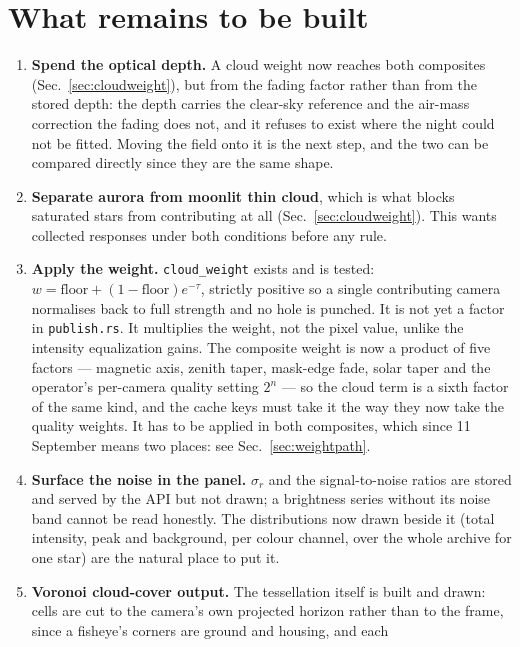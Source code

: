 \documentclass[11pt,a4paper]{article}
\begin{document}
\section{What remains to be built}
\label{sec:remains}

\begin{enumerate}
  \item \textbf{Spend the optical depth.} A cloud weight now reaches both
    composites (Sec.~\ref{sec:cloudweight}), but from the fading factor rather
    than from the stored depth: the depth carries the clear-sky reference and
    the air-mass correction the fading does not, and it refuses to exist where
    the night could not be fitted. Moving the field onto it is the next step,
    and the two can be compared directly since they are the same shape.
  \item \textbf{Separate aurora from moonlit thin cloud}, which is what blocks
    saturated stars from contributing at all (Sec.~\ref{sec:cloudweight}).
    This wants collected responses under both conditions before any rule.
  \item \textbf{Apply the weight.} \texttt{cloud\_weight} exists and is tested:
    $w=\text{floor}+(1-\text{floor})e^{-\tau}$, strictly positive so a single
    contributing camera normalises back to full strength and no hole is punched.
    It is not yet a factor in \texttt{publish.rs}. It multiplies the weight, not
    the pixel value, unlike the intensity equalization gains. The composite
    weight is now a product of five factors --- magnetic axis, zenith taper,
    mask-edge fade, solar taper and the operator's per-camera quality setting
    $2^{n}$ --- so the cloud term is a sixth factor of the same kind, and the
    cache keys must take it the way they now take the quality weights. It has to
    be applied in both composites, which since 11 September means two places:
    see Sec.~\ref{sec:weightpath}.
  \item \textbf{Surface the noise in the panel.} $\sigma_r$ and the
    signal-to-noise ratios are stored and served by the API but not drawn; a
    brightness series without its noise band cannot be read honestly. The
    distributions now drawn beside it (total intensity, peak and background, per
    colour channel, over the whole archive for one star) are the natural place
    to put it.
  \item \textbf{Voronoi cloud-cover output.} The tessellation itself is built
    and drawn: cells are cut to the camera's own projected horizon rather than to
    the frame, since a fisheye's corners are ground and housing, and each

\end{enumerate}
\end{document}
